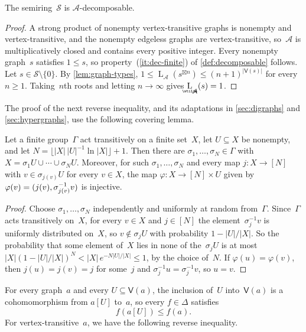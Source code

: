 \documentclass[11pt,letterpaper]{article}
\DeclareMathOperator{\declength}{L}
\DeclareMathOperator{\asympdeclength}{\underaccent{\wtilde}{L}}
\begin{document}
\begin{lemma}\label{lem:graph-decomp}
The semiring~$\mathcal{S}$ is $\mathcal{A}$-decomposable.
\end{lemma}
\begin{proof}
A strong product of nonempty vertex-transitive graphs is nonempty and vertex-transitive, and the nonempty edgeless graphs are vertex-transitive, so~$\mathcal{A}$ is multiplicatively closed and contains every positive integer. Every nonempty graph~$s$ satisfies $1 \leq s$, so property~(\ref{it:dec-finite}) of \cref{def:decomposable} follows. Let $s \in \mathcal{S} \setminus \{0\}$. By \cref{lem:graph-types}, $1 \leq \declength_{\mathcal{A}}(s^{\boxtimes n}) \leq (n+1)^{|\mathsf{V}(s)|}$ for every $n \geq 1$. Taking~$n$th roots and letting $n \to \infty$ gives $\asympdeclength_{\mathcal{A}}(s) = 1$.
\end{proof}

The proof of the next reverse inequality, and its adaptations in \cref{sec:digraphs} and \cref{sec:hypergraphs}, use the following covering lemma.

\begin{lemma}\label{lem:covering-automorphisms}
Let a finite group~$\Gamma$ act transitively on a finite set~$X$, let $U \subseteq X$ be nonempty, and let $N = \lfloor |X|\, |U|^{-1} \ln |X| \rfloor + 1$. Then there are $\sigma_1, \ldots, \sigma_N \in \Gamma$ with $X = \sigma_1 U \cup \cdots \cup \sigma_N U$. Moreover, for such $\sigma_1, \ldots, \sigma_N$ and every map $j : X \to [N]$ with $v \in \sigma_{j(v)} U$ for every $v \in X$, the map $\varphi : X \to [N] \times U$ given by $\varphi(v) = (j(v), \sigma_{j(v)}^{\smash[t]{-1}} v)$ is injective.
\end{lemma}
\begin{proof}
Choose $\sigma_1, \ldots, \sigma_N$ independently and uniformly at random from~$\Gamma$. Since~$\Gamma$ acts transitively on~$X$, for every $v \in X$ and $j \in [N]$ the element~$\sigma_j^{-1} v$ is uniformly distributed on~$X$, so $v \notin \sigma_j U$ with probability $1 - |U|/|X|$. So the probability that some element of~$X$ lies in none of the~$\sigma_j U$ is at most $|X| (1 - |U|/|X|)^N < |X|\, e^{-N |U|/|X|} \leq 1$, by the choice of~$N$. If $\varphi(u) = \varphi(v)$, then $j(u) = j(v) = j$ for some~$j$ and $\sigma_j^{-1} u = \sigma_j^{-1} v$, so $u = v$.
\end{proof}

For every graph~$a$ and every $U \subseteq \mathsf{V}(a)$, the inclusion of~$U$ into~$\mathsf{V}(a)$ is a cohomomorphism from $a[U]$ to~$a$, so every $f \in \Delta$ satisfies 
\[
f(a[U]) \leq f(a).
\]
For vertex-transitive~$a$, we have the following reverse inequality.
\end{document}
